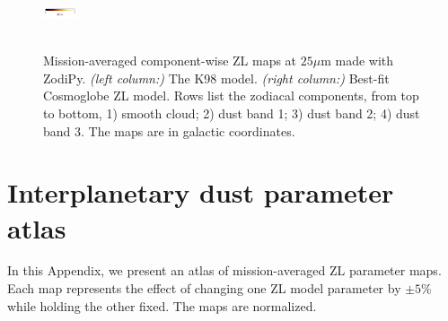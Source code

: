 \documentclass[twocolumn]{aa}
\begin{document}
\begin{figure}[hbt]
{    \includegraphics[width=1cm,angle=90]{figs/comp_maps/cbar_2.pdf}%
    }\\
    \\
    \caption{Mission-averaged component-wise ZL maps at $25\mu$m made with ZodiPy. 
    \textit{(left column:)} The K98 model. \textit{(right column:)} Best-fit Cosmoglobe ZL model.
    Rows list the zodiacal components, from top to bottom, 1) smooth cloud; 2) dust band 1; 3) 
    dust band 2; 4) dust band 3. The maps are in galactic coordinates.}
    \label{fig:mission-averaged-comp-maps}
\end{figure}

\clearpage

\section{Interplanetary dust parameter atlas}
\label{sec:param-atlas}
In this Appendix, we present an atlas of mission-averaged ZL parameter maps.
Each map represents the effect of changing one ZL model parameter by $\pm 5\%$ while holding the other fixed. The maps are normalized.
\end{document}
